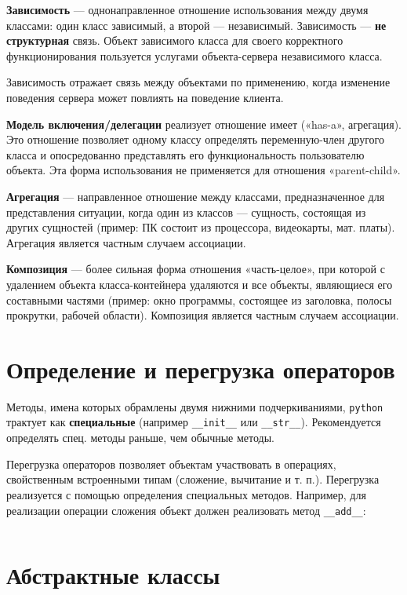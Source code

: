 \documentclass[a4paper,12pt,oneside]{extbook}
\begin{document}
\textbf{Зависимость} — однонаправленное отношение использования между двумя классами: один класс зависимый, а второй — независимый. Зависимость — \textbf{не структурная} связь. Объект зависимого класса для своего корректного функционирования пользуется услугами объекта-сервера независимого класса.

Зависимость отражает связь между объектами по применению, когда изменение поведения сервера может повлиять на поведение клиента.

\textbf{Модель включения/делегации} реализует отношение имеет («has-a», агрегация). Это отношение позволяет одному классу определять переменную-член другого класса и опосредованно представлять его функциональность пользователю объекта. Эта форма использования не применяется для отношения «parent-child».

\textbf{Агрегация} — направленное отношение между классами, предназначенное для представления ситуации, когда один из классов — сущность, состоящая из других сущностей (пример: ПК состоит из процессора, видеокарты, мат. платы). Агрегация является частным случаем ассоциации.

\textbf{Композиция} — более сильная форма отношения «часть-целое», при которой с удалением объекта класса-контейнера удаляются и все объекты, являющиеся его составными частями (пример: окно программы, состоящее из заголовка, полосы прокрутки, рабочей области). Композиция является частным случаем ассоциации.

\section{Определение и перегрузка операторов}%
\label{sec:Определение и перегрузка операторов}

Методы, имена которых обрамлены двумя нижними подчеркиваниями, \texttt{python} трактует как \textbf{специальные} (например \texttt{\_\_init\_\_} или \texttt{\_\_str\_\_}). Рекомендуется определять спец. методы раньше, чем обычные методы.

Перегрузка операторов позволяет объектам участвовать в операциях, свойственным встроенными типам (сложение, вычитание и т. п.). Перегрузка реализуется с помощью определения специальных методов. Например, для реализации операции сложения объект должен реализовать метод \texttt{\_\_add\_\_}:
\inputminted{python}{./examples/add.py}

\section{Абстрактные классы}%
\label{sec:Абстрактные классы}
\end{document}
